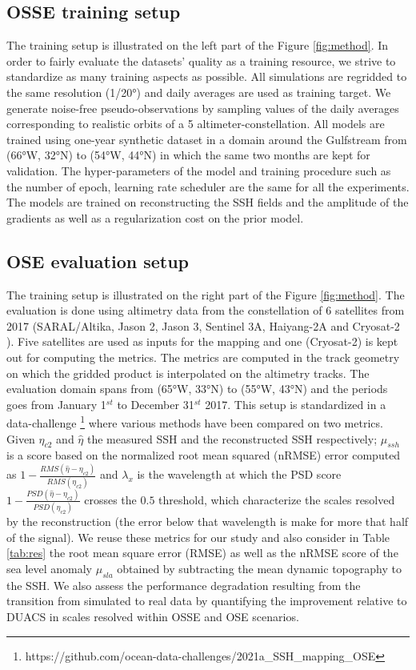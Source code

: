 \begin{bibunit}
\subsection{OSSE training setup}
\label{ssec:training}
The training setup is illustrated on the left part of the Figure \ref{fig:method}.
In order to fairly evaluate the datasets' quality as a training resource, we strive to standardize as many training aspects as possible.
All simulations are regridded to the same resolution (1/20°) and daily averages are used as training target. We generate noise-free pseudo-observations by sampling values of the daily averages corresponding to realistic orbits of a 5 altimeter-constellation. All models are trained using one-year synthetic dataset in a domain around the Gulfstream from (66°W, 32°N) to (54°W, 44°N) in which the same two months are kept for validation. The hyper-parameters of the model and training procedure such as the number of epoch, learning rate scheduler are the same for all the experiments. The models are trained on reconstructing the SSH fields and the amplitude of the gradients as well as a regularization cost on the prior model.

\subsection{OSE evaluation setup}
\label{ssec:eval}
The training setup is illustrated on the right part of the Figure \ref{fig:method}.
The evaluation is done using altimetry data from the constellation of 6 satellites from 2017 (SARAL/Altika, Jason 2, Jason 3, Sentinel 3A, Haiyang-2A and Cryosat-2 ). Five satellites are used as inputs for the mapping and one (Cryosat-2) is kept out for computing the metrics. The metrics are computed in the track geometry on which the gridded product is interpolated on the altimetry tracks. The evaluation domain spans from (65°W, 33°N) to (55°W, 43°N)  and the periods goes from January 1$^{st}$ to December 31$^{st}$ 2017. This setup is standardized in a data-challenge \footnote{https://github.com/ocean-data-challenges/2021a\_SSH\_mapping\_OSE} where various methods have been compared on two metrics. Given $\eta_{c2}$ and $\hat{\eta}$ the measured SSH and the reconstructed SSH respectively; $\mu_{ssh}$ is a score based on the normalized root mean squared (nRMSE) error  computed as $1 - \frac{RMS(\hat{\eta} - \eta_{c2})}{RMS(\eta_{c2})}$ and $\lambda_x$ is the wavelength at which the PSD score  $1 - \frac{PSD(\hat{\eta} - \eta_{c2})}{PSD(\eta_{c2})}$ crosses the $0.5$ threshold, which characterize the scales resolved by the reconstruction (the error below that wavelength is make for more that half of the signal). We reuse these metrics for our study and also consider in Table \ref{tab:res} the root mean square error (RMSE) as well as the nRMSE score of the sea level anomaly $\mu_{sla}$ obtained by subtracting the mean dynamic topography to the SSH. We also assess the performance degradation resulting from the transition from simulated to real data by quantifying the improvement relative to DUACS in scales resolved within OSSE and OSE scenarios.


\end{bibunit}
